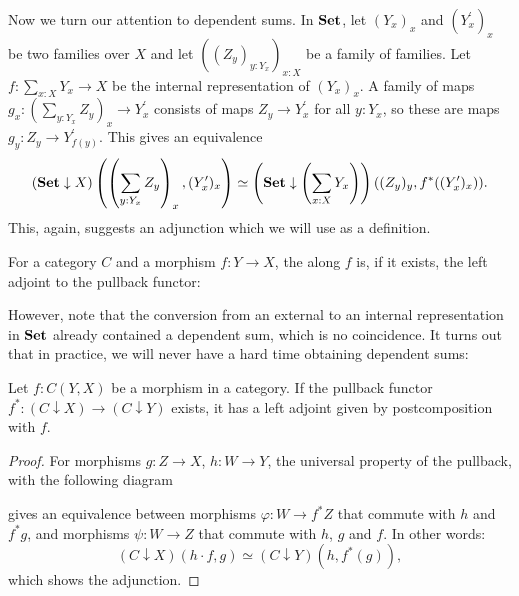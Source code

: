Now we turn our attention to dependent sums. In $ \mathbf{Set} $, let $ (Y_x)_x $ and $ (Y^\prime_x)_x $ be two families over $ X $ and let $ ((Z_y)_{y : Y_x})_{x : X} $ be a family of families. Let $ f: \sum_{x : X} Y_x \to X $ be the internal representation of $ (Y_x)_x $. A family of maps $ g_x : (\sum_{y : Y_x} Z_y)_x \to Y^\prime_x $ consists of maps $ Z_y \to Y^\prime_x $ for all $ y : Y_x $, so these are maps $ g_y : Z_y \to Y^\prime_{f(y)} $. This gives an equivalence
\[ (\mathbf{Set} \downarrow X)\left(\left( \sum_{y : Y_x} Z_y \right)_x, (Y^\prime_x)_x \right) \simeq \left(\mathbf{Set} \downarrow \left(\sum_{x : X} Y_x \right) \right)((Z_y)_y, f^*((Y^\prime_x)_x)). \]
This, again, suggests an adjunction which we will use as a definition.
\begin{definition}
  For a category $ C $ and a morphism $ f: Y \to X $, the  along $ f $ is, if it exists, the left adjoint to the pullback functor:
  \begin{center}
  \end{center}
\end{definition}

However, note that the conversion from an external to an internal representation in $ \mathbf{Set} $ already contained a dependent sum, which is no coincidence. It turns out that in practice, we will never have a hard time obtaining dependent sums:
\begin{lemma}\label{lem:sum-postcomposition}
  Let $ f : C(Y, X) $ be a morphism in a category. If the pullback functor $ f^*: (C \downarrow X) \to (C \downarrow Y) $ exists, it has a left adjoint given by postcomposition with $ f $.
\end{lemma}
\begin{proof}
  For morphisms $ g: Z \to X $, $ h: W \to Y $, the universal property of the pullback, with the following diagram
  \begin{center}
  \end{center}
  gives an equivalence between morphisms $ \varphi: W \to f^* Z $ that commute with $ h $ and $ f^* g $, and morphisms $ \psi: W \to Z $ that commute with $ h $, $ g $ and $ f $. In other words:
  \[ (C \downarrow X)(h \cdot f, g) \simeq (C \downarrow Y)(h, f^*(g)), \]
  which shows the adjunction.
\end{proof}

